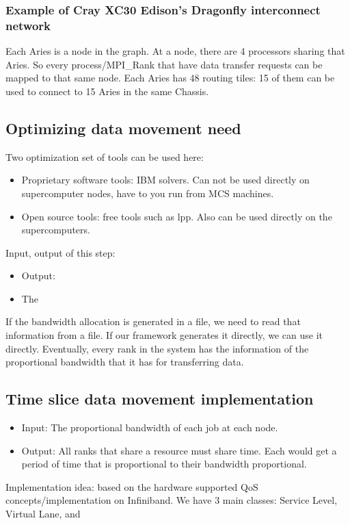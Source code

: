 \documentclass[letter]{article}
\begin{document}
\subsubsection{Example of Cray XC30 Edison's Dragonfly interconnect network}

Each Aries is a node in the graph. At a node, there are 4 processors sharing that Aries. So every process/MPI\_Rank that have data transfer requests can be mapped to that same node. Each Aries has 48 routing tiles: 15 of them can be used to connect to 15 Aries in the same Chassis. 

\subsection {Optimizing data movement need}
Two optimization set of tools can be used here:
\begin{itemize}
\item Proprietary software tools: IBM solvers. Can not be used directly on supercomputer nodes, have to you run from MCS machines.
\item Open source tools: free tools such as lpp. Also can be used directly on the supercomputers.
\end{itemize}

Input, output of this step:
\begin{itemize}
\item Output:
\item The
\end{itemize}

If the bandwidth allocation is generated in a file, we need to read that information from a file. If our framework generates it directly, we can use it directly. Eventually, every rank in the system has the information of the proportional bandwidth that it has for transferring data.

\subsection{Time slice data movement implementation}
\begin{itemize}
\item Input: The proportional bandwidth of each job at each node.
\item Output: All ranks that share a resource must share time. Each would get a period of time that is proportional to their bandwidth proportional.
\end{itemize}

Implementation idea: based on the hardware supported QoS concepts/implementation on Infiniband. We have 3 main classes: Service Level, Virtual Lane, and 
\end{document}
